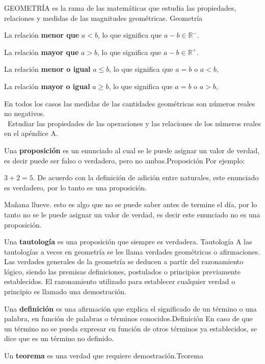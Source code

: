 \begin{ideas}
\begin{ideas}{GEOMETRÍA es la rama de las matemáticas que estudia las propiedades, relaciones y
medidas de las magnitudes geométricas.
}{Geometría}
\begin{lista}
\item La relación \textbf{menor que} $a<b$,
 lo que significa que $a-b \in \mathbb{R^-}$.
\item La relación \textbf{mayor que} $a>b$,
lo que significa que $a-b \in \mathbb{R^+}$.
\item La relación \textbf{menor o igual} $a\leq b$, lo que significa que $a=b$ o $a<b$,
\item La relación \textbf{mayor o igual} $a\geq b$, lo que significa que $a=b$ o $a>b$,
\end{lista}
En todos los casos las medidas de las cantidades geométricas son números reales no negativos.\\
\nota \, Estudiar las propiedades de las operaciones y las relaciones de los
números reales en el apéndice A.
\end{ideas}
\begin{ideas}{Una \textbf{proposición} es un enunciado al cual se le puede asignar un valor de verdad,
es decir puede ser falso o verdadero, pero no ambas.}{Proposición}
Por ejemplo:
\begin{lista}
 \item $3+2=5$. De acuerdo con la definición de adición entre naturales,
este enunciado es verdadero, por lo tanto es una proposición.
\item Mañana llueve. esto es algo que no se puede saber antes de termine el día, por lo tanto
no se le puede asignar un valor de verdad, es decir este enunciado no es una proposición.
\end{lista}
\begin{ideas}{Una \textbf{tautología} es una proposición que siempre es
verdadera. }{Tautología}
 A las tautologías a veces en geometría se les llama verdades geométricas o afirmaciones.
Las verdades generales de la geometría se deducen a partir del razonamiento lógico,
siendo las premisas definiciones, postulados o principios previamente
establecidos. El razonamiento utilizado para establecer cualquier verdad o
principio es llamado una demostración.
\end{ideas}
\begin{ideas}{Una \textbf{definición} es una afirmación que explica el significado de un término o una palabra, en función
de palabras o términos conocidos.}{Definición}
En caso de que un término no se pueda expresar en función de otros términos ya establecidos, se dice que es un término no definido.
\end{ideas}
\begin{ideas}{Un \textbf{teorema} es una verdad que requiere demostración.}{Teorema}

\end{ideas}
\end{ideas}
\end{ideas}
